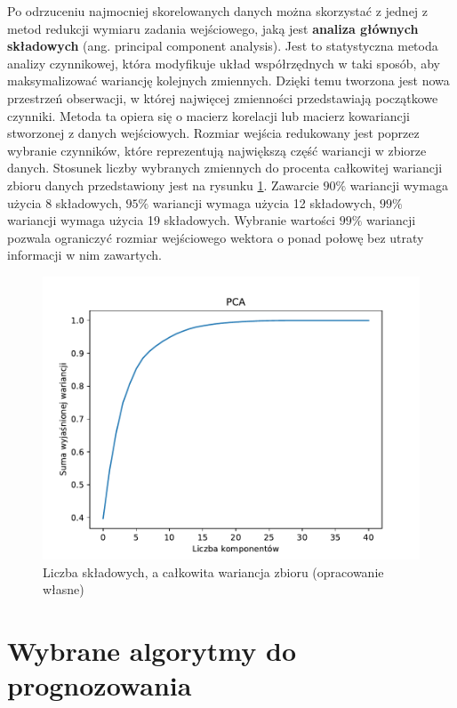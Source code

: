 \documentclass[a4paper, twoside, 11pt, openright]{article}
\begin{document}
Po odrzuceniu najmocniej skorelowanych danych można skorzystać z jednej z metod redukcji wymiaru zadania wejściowego, jaką jest \textbf{analiza głównych składowych} (ang. principal component analysis). Jest to statystyczna metoda analizy czynnikowej, która modyfikuje układ współrzędnych w taki sposób, aby maksymalizować wariancję kolejnych zmiennych. Dzięki temu tworzona jest nowa przestrzeń obserwacji, w której najwięcej zmienności przedstawiają początkowe czynniki. Metoda ta opiera się o macierz korelacji lub macierz kowariancji stworzonej z danych wejściowych. Rozmiar wejścia redukowany jest poprzez wybranie czynników, które reprezentują największą część wariancji w zbiorze danych. Stosunek liczby wybranych zmiennych do procenta całkowitej wariancji zbioru danych przedstawiony jest na rysunku \ref{img:pca_variance}. Zawarcie $90\%$ wariancji wymaga użycia 8 składowych,  $95\%$ wariancji wymaga użycia 12 składowych, $99\%$ wariancji wymaga użycia 19 składowych. Wybranie wartości $99\%$ wariancji pozwala ograniczyć rozmiar wejściowego wektora o ponad połowę bez utraty informacji w nim zawartych.

\begin{figure}[H]
\centering 
\includegraphics[scale=0.9]{img/pca_variance.pdf}
\caption{Liczba składowych, a całkowita wariancja zbioru (opracowanie własne)}
\label{img:pca_variance}
\end{figure}

\newpage

\section{Wybrane algorytmy do prognozowania}
\end{document}
